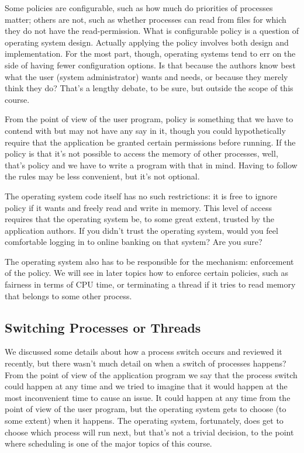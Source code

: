 Some policies are configurable, such as how much do priorities of processes matter; others are not, such as whether processes can read from files for which they do not have the read-permission. What is configurable policy is a question of operating system design. Actually applying the policy involves both design and implementation. For the most part, though, operating systems tend to err on the side of having fewer configuration options. Is that because the authors know best what the user (system administrator) wants and needs, or because they merely think they do? That's a lengthy debate, to be sure, but outside the scope of this course.

From the point of view of the user program, policy is something that we have to contend with but may not have any say in it, though you could hypothetically require that the application be granted certain permissions before running. If the policy is that it's not possible to access the memory of other processes, well, that's policy and we have to write a program with that in mind. Having to follow the rules may be less convenient, but it's not optional.

The operating system code itself has no such restrictions: it is free to ignore policy if it wants and freely read and write in memory. This level of access requires that the operating system be, to some great extent, trusted by the application authors. If you didn't trust the operating system, would you feel comfortable logging in to online banking on that system? Are you sure?

The operating system also has to be responsible for the mechanism: enforcement of the policy. We will see in later topics how to enforce certain policies, such as fairness in terms of CPU time, or terminating a thread if it tries to read memory that belongs to some other process. 

\subsection*{Switching Processes or Threads}
We discussed some details about how a process switch occurs and reviewed it recently, but there wasn't much detail on when a switch of processes happens? From the point of view of the application program we say that the process switch could happen at any time and we tried to imagine that it would happen at the most inconvenient time to cause an issue. It could happen at any time from the point of view of the user program, but the operating system gets to choose (to some extent) when it happens. The operating system, fortunately, does get to choose which process will run next, but that's not a trivial decision, to the point where scheduling is one of the major topics of this course.

